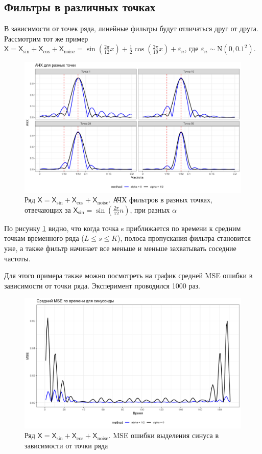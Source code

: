 \documentclass[12pt, specialist, subf
]{disser}
\theoremstyle{definition}
\newcommand{\TS}{\mathsf{X}}
\begin{document}
\subsection{Фильтры в различных точках}
В зависимости от точек ряда, линейные фильтры будут отличаться друг от друга. Рассмотрим тот же пример $\TS = \TS_{\sin} + \TS_{\cos} + \TS_{\mathrm{noise}} =
	\sin\left(\frac{2\pi}{12}x\right) +
	\frac{1}{2}\cos\left(\frac{2\pi}{19}x\right)+
	\varepsilon_n$,
где $\varepsilon_n \sim \mathrm N(0, 0.1^2)$.
\begin{figure}[H]
	\centering
	\includegraphics[width=1\textwidth]{img/afc_4_points.png}
	\caption{Ряд $\TS = \TS_{\sin} + \TS_{\cos}+ \TS_{\mathrm{noise}}$. АЧХ фильтров в разных точках, отвечающих за $\TS_{\sin} = \sin\left(\frac{2\pi}{12} n \right)$, при разных $\alpha$}
	\label{fig:filter_point_depends}
\end{figure}

По рисунку \ref{fig:filter_point_depends} видно, что когда точка s приближается по времени к средним точкам временного ряда ($L \leq s \leq K$), полоса пропускания фильтра становится уже, а также фильтр начинает все меньше и меньше захватывать соседние частоты.

Для этого примера также можно посмотреть на график средней MSE ошибки в зависимости от точки ряда. Эксперимент проводился 1000 раз.
\begin{figure}[H]
	\centering
	\includegraphics[width=1\textwidth]{img/mse_y1_time.png}
	\caption{Ряд $\TS = \TS_{\sin} + \TS_{\cos}+ \TS_{\mathrm{noise}}$. MSE ошибки выделения синуса в зависимости от точки ряда}
	\label{fig:mse_filter_point_depends}
\end{figure}
\end{document}
